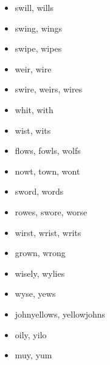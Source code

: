 \documentclass[a4wide,11pt]{report}
\begin{document}
\begin{itemize}
  \item swill, wills
  \item swing, wings
  \item swipe, wipes
  \item weir, wire
  \item swire, weirs, wires
  \item whit, with
  \item wist, wits
  \item flows, fowls, wolfs
  \item nowt, town, wont
  \item sword, words
  \item rowes, swore, worse
  \item wirst, wrist, writs
  \item grown, wrong
  \item wisely, wylies
  \item wyse, yews
  \item johnyellows, yellowjohns
  \item oily, yilo
  \item muy, yum
\end{itemize}
\vfill
\end{document}
